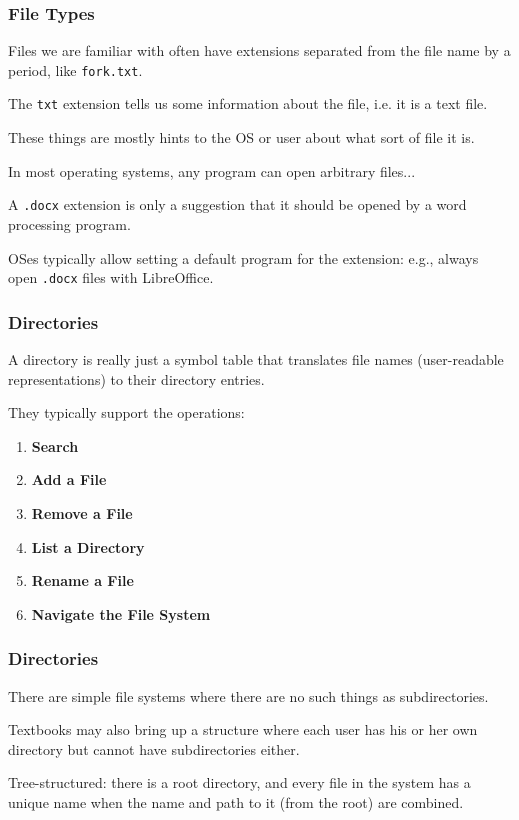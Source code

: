 \begin{frame}
\frametitle{File Types}

Files we are familiar with often have extensions separated from the file name by a period, like \texttt{fork.txt}. 

The \texttt{txt} extension tells us some information about the file, i.e. it is a text file. 

These things are mostly hints to the OS or user about what sort of file it is. 

In most operating systems, any program can open arbitrary files... 

A \texttt{.docx} extension is only a suggestion that it should be opened by a word processing program.

OSes typically allow setting a default program for the extension: e.g., always open \texttt{.docx} files with LibreOffice.


\end{frame}

\begin{frame}
\frametitle{Directories}

A directory is really just a symbol table that translates file names (user-readable representations) to their directory entries.

They typically support the operations:

\begin{enumerate}
	\item \textbf{Search}
	\item \textbf{Add a File}
	\item \textbf{Remove a File}
	\item \textbf{List a Directory}
	\item \textbf{Rename a File}
	\item \textbf{Navigate the File System}
\end{enumerate}


\end{frame}

\begin{frame}
\frametitle{Directories}

There are simple file systems where there are no such things as subdirectories.

Textbooks may also bring up a structure where each user has his or her own directory but cannot have subdirectories either. 

Tree-structured: there is a root directory, and every file in the system has a unique name when the name and path to it (from the root) are combined.

\end{frame}

